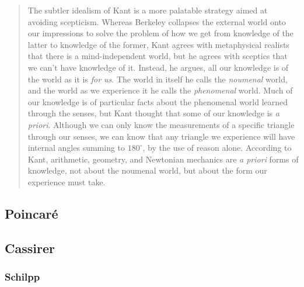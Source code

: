 \begin{quote}
    The subtler idealism of Kant is a more palatable strategy aimed at avoiding scepticism.  Whereas Berkeley collapses the external world onto our impressions to solve the problem of how we get from knowledge of the latter to knowledge of the former, Kant agrees with metaphysical realists that there is a mind-independent world, but he agrees with sceptics that we can't have knowledge of it.  Instead, he argues, all our knowledge is of the world as it is \emph{for us}.  The world in itself he calls the \emph{noumenal} world, and the world as we experience it he calls the \emph{phenomenal} world.  Much of our knowledge is of particular facts about the phenomenal world learned through the senses, but Kant thought that some of our knowledge is \emph{a priori}.  Although we can only know the measurements of a specific triangle through our senses, we can know that any triangle we experience will have internal angles summing to $180^\circ$, by the use of reason alone.  According to Kant, arithmetic, geometry, and Newtonian mechanics are \emph{a priori} forms of knowledge, not about the noumenal world, but about the form our experience must take.  \citep[p. 146]{Ladyman2002}
\end{quote}



\subsection{Poincar\'e}




\subsection{Cassirer}

\subsubsection{Schilpp}

